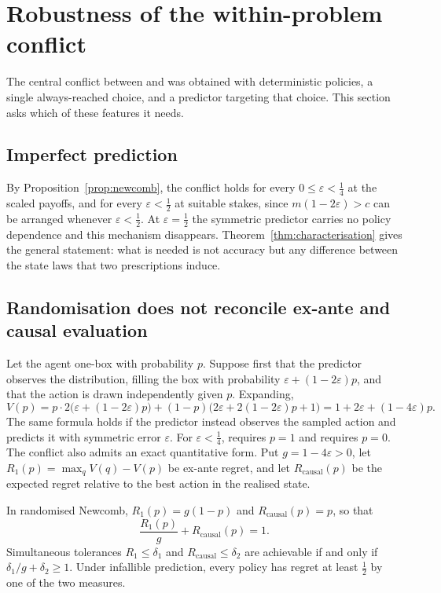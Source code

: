 \section{Robustness of the within-problem conflict}\label{sec:robust}

The central conflict between  and  was obtained with deterministic policies, a single
always-reached choice, and a predictor targeting that choice. This section asks which of these
features it needs.

\subsection{Imperfect prediction}

By Proposition~\ref{prop:newcomb}, the conflict holds for every $0\le\varepsilon<\tfrac14$ at the
scaled payoffs, and for every $\varepsilon<\tfrac12$ at suitable stakes, since $m(1-2\varepsilon)>c$ can
be arranged whenever $\varepsilon<\tfrac12$. At $\varepsilon=\tfrac12$ the symmetric predictor carries no
policy dependence and this mechanism disappears. Theorem~\ref{thm:characterisation} gives the
general statement: what is needed is not accuracy but any difference between the state laws that
two prescriptions induce.

\subsection{Randomisation does not reconcile ex-ante and causal evaluation}

Let the agent one-box with probability $p$. Suppose first that the predictor observes the
distribution, filling the box with probability $\varepsilon+(1-2\varepsilon)p$, and that the action is
drawn independently given $p$. Expanding,
\[
  V(p)=p\cdot2\bigl(\varepsilon+(1-2\varepsilon)p\bigr)+(1-p)\bigl(2\varepsilon+2(1-2\varepsilon)p+1\bigr)
      =1+2\varepsilon+(1-4\varepsilon)p .
\]
The same formula holds if the predictor instead observes the sampled action and predicts it with
symmetric error $\varepsilon$. For $\varepsilon<\tfrac14$,  requires $p=1$ and  requires $p=0$.
The conflict also admits an exact quantitative form. Put $g=1-4\varepsilon>0$, let
$R_1(p)=\max_qV(q)-V(p)$ be ex-ante regret, and let $R_{\mathrm{causal}}(p)$ be the expected regret
relative to the best action in the realised state.

\begin{proposition}\label{prop:tradeoff}
In randomised Newcomb, $R_1(p)=g(1-p)$ and $R_{\mathrm{causal}}(p)=p$, so that
\[
  \frac{R_1(p)}{g}+R_{\mathrm{causal}}(p)=1 .
\]
Simultaneous tolerances $R_1\le\delta_1$ and $R_{\mathrm{causal}}\le\delta_2$ are achievable if and only
if $\delta_1/g+\delta_2\ge1$. Under infallible prediction, every policy has regret at least $\tfrac12$
by one of the two measures.
\end{proposition}

